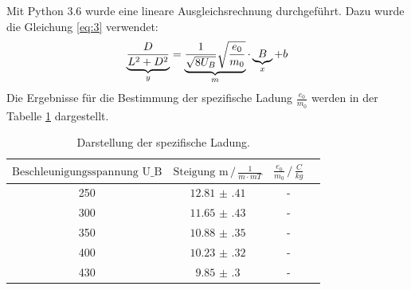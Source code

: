 Mit Python 3.6 wurde eine lineare Ausgleichsrechnung durchgeführt.
Dazu wurde die Gleichung \ref{eq:3} verwendet:
\begin{equation*}
  \underbrace{\frac{D}{L^2+D^2}}_{\mathclap{y}} = \underbrace{\frac{1}{\sqrt{8U_B}} \sqrt{\frac{e_0}{m_0}}}_{\mathclap{m}} \cdot \underbrace{B}_{\mathclap{x}} + b
\end{equation*}
Die Ergebnisse für die Bestimmung der spezifische Ladung $\frac{e_0}{m_0}$ werden
in der Tabelle \ref{tab:6} dargestellt.
\begin{table}[H]
  \centering
  \caption{Darstellung der spezifische Ladung.}
  \label{tab:6}
  \begin{tabular}{c c c c}
\toprule
$\text{Beschleunigungsspannung U_B}$&$\text{Steigung m} \,/\, \frac{1}{m\cdot mT}$ &$\frac{e_0}{m_0} \,/\, \frac{C}{kg}$\\
\midrule
250 &$\num{12.81(41)}$ &-\\
300 &$\num{11.65(43)}$ &-\\
350 &$\num{10.88(35)}$ &-\\
400 &$\num{10.23(32)}$ &-\\
430 &$\num{9.85(30)}$  &-\\
\bottomrule
  \end{tabular}
\end{table}
